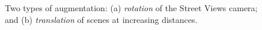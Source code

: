 \begin{figure}[t!]
	\centering
	\hspace*{-5mm}
	\vspace{-0.4cm}
	\caption{Two types of augmentation: (a) \emph{rotation} of the Street Views camera; and (b) \emph{translation} of scenes at increasing distances.}
	\vspace{-0.4cm}
\end{figure}



